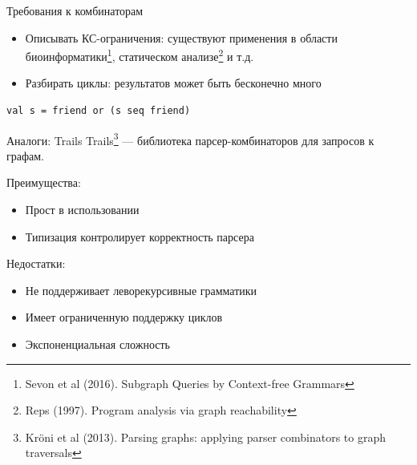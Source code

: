 \documentclass[aspectratio=169]{beamer}
\begin{document}
\begin{frame}[fragile]{Требования к комбинаторам}
  \begin{itemize}
    \item Описывать КС-ограничения: существуют применения в области биоинформатики\footnote[1]{Sevon et al (2016). Subgraph Queries by Context-free Grammars}, статическом анализе\footnote[2]{Reps (1997). Program analysis via graph reachability} и т.д.
    \item Разбирать циклы: результатов может быть бесконечно много
  \end{itemize}
  \begin{verbatim}
val s = friend or (s seq friend)
\end{verbatim}
\end{frame}


\begin{frame}{Аналоги: Trails}
  Trails\footnote[1]{Kr\"{o}ni et al (2013). Parsing graphs: applying parser combinators to graph traversals} --- библиотека парсер-комбинаторов для запросов к графам.

  Преимущества:
  \begin{itemize}
    \item Прост в использовании
    \item Типизация контролирует корректность парсера
  \end{itemize}
  Недостатки:
  \begin{itemize}
    \item Не поддерживает леворекурсивные грамматики
    \item Имеет ограниченную поддержку циклов
    \item Экспоненциальная сложность
  \end{itemize}
\end{frame}
\end{document}

